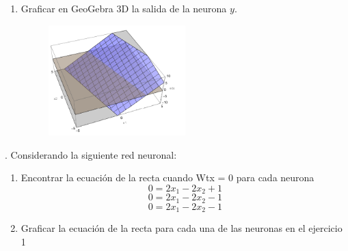 \documentclass{article}
\begin{document}
\begin{flushleft}
\begin{enumerate}
\begin{figure}[H]
    \end{figure}
    \item Graficar en GeoGebra 3D la salida de la neurona $y$.
    \begin{figure}[H]
      \centering
      \includegraphics[width=0.5\textwidth]{Imagen0.PNG}  %
    \end{figure}
    \end{enumerate}

. Considerando la siguiente red neuronal:
\begin{enumerate}
  \item
   Encontrar la ecuación de la recta cuando Wtx = 0 para cada neurona
   \[ 0 =   2x_1   - 2x_2  + 1 \]
   \[ 0 =   2x_1 - 2x_2 - 1 \]
   \[ 0 =   2x_1 - 2x_2 - 1 \]
  \item Graficar la ecuación de la recta para cada una de las neuronas en el ejercicio 1 


\end{enumerate}
\end{flushleft}
\end{document}
